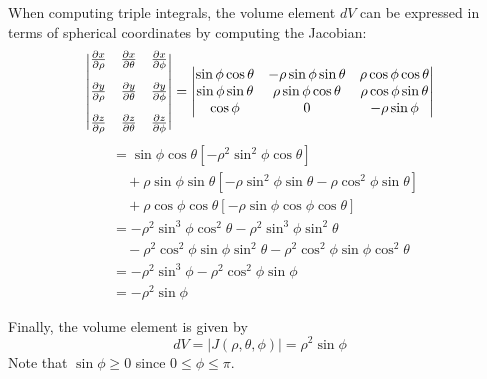\documentclass[handout]{ximera}
\begin{document}
When computing triple integrals, the volume element $dV$ can be expressed in terms of spherical coordinates by computing the Jacobian:
\[
\begin{vmatrix}
\frac{\partial x}{\partial \rho} & \frac{\partial x}{\partial \theta} &\frac{\partial x}{\partial \phi}\\[10pt]
\frac{\partial y}{\partial \rho} & \frac{\partial y}{\partial \theta} &\frac{\partial y}{\partial \phi}\\[10pt]
\pp[z]{\rho} & \frac{\partial z}{\partial \theta} &\frac{\partial z}{\partial \phi}
\end{vmatrix}
= 
\begin{vmatrix}
\sin \phi \cos \theta& -\rho \sin \phi \sin \theta &\rho \cos \phi \cos \theta\\ 
\sin \phi \sin \theta& \rho \sin \phi \cos\theta &\rho \cos \phi \sin \theta\\ 
 \cos \phi & 0 &-\rho \sin \phi\\
\end{vmatrix}
\]
\begin{align*}
&= \sin \phi \cos \theta \left[-\rho^2 \sin^2\phi\cos\theta \right]\\
 &\quad+\rho \sin \phi \sin \theta\left[-\rho\sin^2\phi\sin\theta- \rho\cos^2\phi\sin\theta\right]\\
 & \quad+ \rho \cos \phi \cos \theta \left[-\rho \sin\phi\cos\phi\cos\theta\right]\\
 &= -\rho^2 \sin^3\phi \cos^2\theta -\rho^2 \sin^3\phi \sin^2\theta \\
 & \quad - \rho^2 \cos^2\phi \sin\phi \sin^2\theta - \rho^2 \cos^2\phi \sin\phi \cos^2\theta\\
  &= -\rho^2\sin^3\phi - \rho^2\cos^2\phi\sin\phi\\
 &=-\rho^2 \sin \phi
\end{align*}
 
Finally, the volume element is given by
\[
dV = |J(\rho, \theta, \phi)| = \rho^2 \sin \phi
\]
Note that $\sin \phi \geq 0$ since $0 \leq \phi \leq \pi$.
\end{document}
